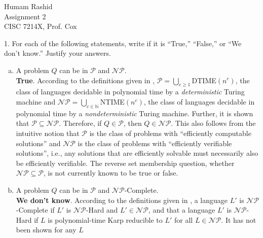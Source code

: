 \documentclass{scrartcl}
\begin{document}
\begin{flushleft}

    Humam Rashid\\
    Assignment 2\\
    CISC 7214X, Prof. Cox\\
    \bigskip

    1. For each of the following statements, write if it is ``True,'' ``False,'' or ``We don't
    know.'' Justify your answers.\\
    \begin{enumerate}[(a)]
        \item A problem $Q$ can be in $\mathcal{P}$ and $\mathcal{NP}$.\\
            \medskip
            \textbf{True}. According to the definitions given in \cite{modernapp}, $\mathcal{P} =
            \bigcup_{c \geq 1}$DTIME$(n^c)$, the class of languages decidable in polynomial time by
            a \emph{deterministic} Turing machine and $\mathcal{NP} = \bigcup_{c \in
            \mathbb{N}}$NTIME$(n^c)$, the class of languages decidable in polynomial time by a
            \emph{nondeterministic} Turing machine. Further, it is shown that $\mathcal{P} \subseteq
            \mathcal{NP}$. Therefore, if $Q \in \mathcal{P}$, then $Q \in \mathcal{NP}$. This also
            follows from the intuitive notion that $\mathcal{P}$ is the class of problems with
            ``efficiently computable solutions'' and $\mathcal{NP}$ is the class of problems with
            ``efficiently verifiable solutions'', i.e., any solutions that are efficiently solvable
            must necessarily also be efficiently verifiable. The reverse set membership question,
            whether $\mathcal{NP} \subseteq \mathcal{P}$, is not currently known to be true or
            false.
        \item A problem $Q$ can be in $\mathcal{P}$ and $\mathcal{NP}$-Complete.\\
            \medskip
            \textbf{We don't know}. According to the definitions given in \cite{modernapp}, a
            language $L'$ is $\mathcal{NP}$-Complete if $L'$ is $\mathcal{NP}$-Hard and $L' \in
            \mathcal{NP}$, and that a language $L'$ is $\mathcal{NP}$-Hard if $L$ is polynomial-time
            Karp reducible to $L'$ for all $L \in \mathcal{NP}$. It has not been shown for any $L$

\end{enumerate}
\end{flushleft}
\end{document}
